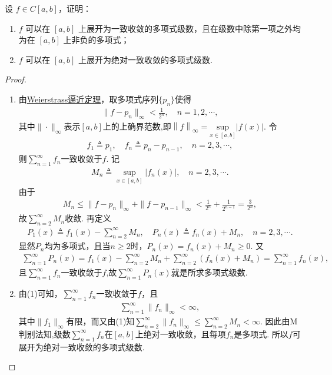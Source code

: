 \documentclass[../../main.tex]{subfiles}%
\begin{document}
\begin{example}
设 $f\in C[a,b]$，证明：
\begin{enumerate}[(1)]
\item $f$ 可以在 $[a,b]$ 上展开为一致收敛的多项式级数，且在级数中除第一项之外均为在 $[a,b]$ 上非负的多项式；
\item $f$ 可以在 $[a,b]$ 上展开为绝对一致收敛的多项式级数.
\end{enumerate}
\end{example}
\begin{proof}
\begin{enumerate}[(1)]
\item 由\hyperref[theorem:多项式逼近有限阶光滑函数-Weierstrass逼近定理]{Weierstrass逼近定理}，取多项式序列$\{p_n\}$使得
\begin{align*}
\|f-p_n\|_\infty < \frac{1}{2^n},\quad n=1,2,\cdots,
\end{align*}
其中$\|\cdot\|_\infty$表示$[a,b]$上的上确界范数,即$\left\| f \right\| _{\infty}=\underset{x\in \left[ a,b \right]}{\mathrm{sup}}\left| f\left( x \right) \right|$.
令
\begin{align*}
f_1\triangleq p_1,\quad f_n\triangleq p_n-p_{n-1},\quad n=2,3,\cdots,
\end{align*}
则$\sum\limits_{n=1}^\infty f_n$一致收敛于$f$. 记
\begin{align*}
M_n\triangleq \sup_{x\in[a,b]} |f_n(x)|,\quad n=2,3,\cdots.
\end{align*}
由于
\begin{align*}
M_n \leqslant \|f-p_n\|_\infty + \|f-p_{n-1}\|_\infty < \frac{1}{2^n}+\frac{1}{2^{n-1}} = \frac{3}{2^n},
\end{align*}
故$\sum\limits_{n=2}^\infty M_n$收敛.
再定义
\begin{align*}
P_1(x)\triangleq f_1(x)-\sum\limits_{n=2}^\infty M_n,\quad 
P_n(x)\triangleq f_n(x)+M_n,\quad n=2,3,\cdots.
\end{align*}
显然$P_n$均为多项式，且当$n\geqslant 2$时，$P_n(x)=f_n(x)+M_n\geqslant 0$. 又
\begin{align*}
\sum\limits_{n=1}^\infty P_n(x)
= f_1(x)-\sum\limits_{n=2}^\infty M_n + \sum\limits_{n=2}^\infty (f_n(x)+M_n) 
= \sum\limits_{n=1}^\infty f_n(x) ,
\end{align*}
且$\sum\limits_{n=1}^\infty f_n$一致收敛于$f$,故$\sum\limits_{n=1}^\infty P_n(x)$就是所求多项式级数.

\item 由(1)可知，$\sum\limits_{n=1}^\infty f_n$一致收敛于$f$，且
\begin{align*}
\sum\limits_{n=1}^\infty \|f_n\|_\infty < \infty,
\end{align*}
其中$\|f_1\|_\infty$有限，而又由(1)知$\sum\limits_{n=2}^\infty \|f_n\|_\infty \leqslant \sum\limits_{n=2}^\infty M_n < \infty$. 因此由M判别法知,级数$\sum\limits_{n=1}^\infty f_n$在$[a,b]$上绝对一致收敛，且每项$f_n$是多项式. 所以$f$可展开为绝对一致收敛的多项式级数. 
\end{enumerate}
\end{proof}
\end{document}
